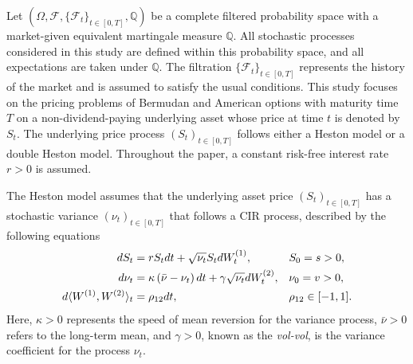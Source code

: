 \documentclass[]{interact}
\theoremstyle{plain}%
\theoremstyle{definition}
\theoremstyle{remark}
\begin{document}
Let $(\Omega, \mathcal{F}, \{\mathcal{F}_t\}_{t \in [0,T]}, \mathbb{Q})$ be a complete filtered probability space with a market-given equivalent martingale measure $\mathbb{Q}$. All stochastic processes considered in this study are defined within this probability space, and all expectations are taken under $\mathbb{Q}$. The filtration $\{\mathcal{F}_t\}_{t \in [0,T]}$ represents the history of the market and is assumed to satisfy the usual conditions. This study focuses on the pricing problems of Bermudan and American options with maturity time $T$ on a non-dividend-paying underlying asset whose price at time $t$ is denoted by $S_t$. The underlying price process $(S_t)_{t \in [0,T]}$ follows either a Heston model or a double Heston model. Throughout the paper, a constant risk-free interest rate $r > 0$ is assumed.

%

%

The Heston model assumes that the underlying asset price $(S_t)_{t \in [0,T]}$ has a stochastic variance $(\nu_t)_{t \in [0,T]}$ that follows a CIR process, described by the following equations
\begin{align*}\label{eq:Heston}
     dS_t &= rS_t  dt + \sqrt{\nu_t} S_t dW_{t}^{(1)}, \notag  &&  S_0 = s > 0,\\
     d\nu_t &= \kappa \left(\bar{\nu} - \nu_t\right) dt + \gamma \sqrt{\nu_t} dW_{t}^{(2)}, && \nu_0 = v > 0,\\
     d\langle W^{(1)}, W^{(2)} \rangle_t &= \rho_{12} dt, && \rho_{12} \in [-1,1].
\end{align*}
Here, $\kappa > 0$ represents the speed of mean reversion for the variance process, $\bar{\nu} > 0$ refers to the long-term mean, and $\gamma > 0$, known as the \textit{vol-vol}, is the variance coefficient for the process $\nu_t$.
\end{document}
